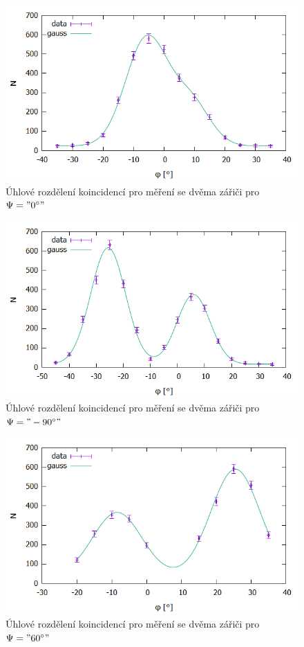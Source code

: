 \documentclass[10pt,a4paper]{article}
\begin{document}
\begin{figure}
\centering
\includegraphics[width=\textwidth]{dva0.png}
\caption{Úhlové rozdělení koincidencí pro měření se dvěma zářiči pro $\Psi="0^\circ"$}
\label{dva0}
\end{figure}
\begin{figure}
\centering
\includegraphics[width=\textwidth]{dva90.png}
\caption{Úhlové rozdělení koincidencí pro měření se dvěma zářiči pro $\Psi="-90^\circ"$}
\label{dva90}
\end{figure}
\begin{figure}
\centering
\includegraphics[width=\textwidth]{dva60.png}
\caption{Úhlové rozdělení koincidencí pro měření se dvěma zářiči pro $\Psi="60^\circ"$}
\label{dva60}
\end{figure}
\end{document}
